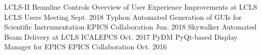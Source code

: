 \begin{cvhonors}
  \cvhonor
    {LCLS-II Beamline Controls}
    {Overview of User Experience Improvements at LCLS}
    {LCLS Users Meeting}
    {Sept. 2018}
  \cvhonor
    {Typhon}
    {Automated Generation of GUIs for Scientific Instrumentation}
    {EPICS Collaboration}
    {Jun. 2018}
  \cvhonor
    {Skywalker}
    {Automated Beam Delivery at LCLS}
    {ICALEPCS}
    {Oct. 2017}
  \cvhonor
    {PyDM}
    {PyQt-based Display Manager for EPICS}
    {EPICS Collaboration}
    {Oct. 2016}
\end{cvhonors}
